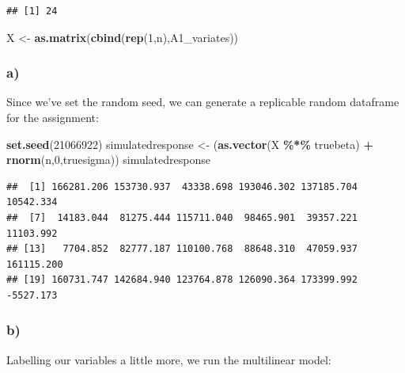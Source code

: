 \documentclass[
]{article}
\newenvironment{Shaded}{\begin{snugshade}}{\end{snugshade}}
\newcommand{\DecValTok}[1]{\textcolor[rgb]{0.00,0.00,0.81}{#1}}
\newcommand{\FunctionTok}[1]{\textcolor[rgb]{0.13,0.29,0.53}{\textbf{#1}}}
\newcommand{\NormalTok}[1]{#1}
\newcommand{\OtherTok}[1]{\textcolor[rgb]{0.56,0.35,0.01}{#1}}
\newcommand{\SpecialCharTok}[1]{\textcolor[rgb]{0.81,0.36,0.00}{\textbf{#1}}}
\begin{document}
\begin{verbatim}
## [1] 24
\end{verbatim}

\begin{Shaded}
\begin{Highlighting}[]
\NormalTok{X }\OtherTok{\textless{}{-}} \FunctionTok{as.matrix}\NormalTok{(}\FunctionTok{cbind}\NormalTok{(}\FunctionTok{rep}\NormalTok{(}\DecValTok{1}\NormalTok{,n),A1\_variates))}
\end{Highlighting}
\end{Shaded}

\subsubsection{a)}\label{a-1}

Since we've set the random seed, we can generate a replicable random
dataframe for the assignment:

\begin{Shaded}
\begin{Highlighting}[]
\FunctionTok{set.seed}\NormalTok{(}\DecValTok{21066922}\NormalTok{)}
\NormalTok{simulatedresponse }\OtherTok{\textless{}{-}}\NormalTok{ (}\FunctionTok{as.vector}\NormalTok{(X }\SpecialCharTok{\%*\%}\NormalTok{ truebeta) }\SpecialCharTok{+} \FunctionTok{rnorm}\NormalTok{(n,}\DecValTok{0}\NormalTok{,truesigma))}
\NormalTok{simulatedresponse }
\end{Highlighting}
\end{Shaded}

\begin{verbatim}
##  [1] 166281.206 153730.937  43338.698 193046.302 137185.704  10542.334
##  [7]  14183.044  81275.444 115711.040  98465.901  39357.221  11103.992
## [13]   7704.852  82777.187 110100.768  88648.310  47059.937 161115.200
## [19] 160731.747 142684.940 123764.878 126090.364 173399.992  -5527.173
\end{verbatim}

\subsubsection{b)}\label{b-1}

Labelling our variables a little more, we run the multilinear model:
\end{document}
